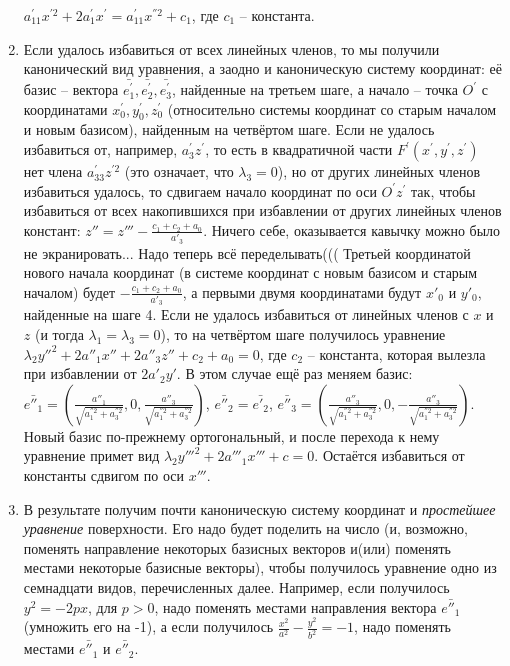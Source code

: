 \documentclass[a4paper, 12pt]{article}
\theoremstyle{definition}
\begin{document}
\begin{enumerate}
    $a_{11}^{'} x^{'2} + 2a_{1}^{'} x^{'} = a_{11}^{'} x^{''2} + c_1$, где $c_1$ – константа.
    \item Если удалось избавиться от всех линейных членов, то мы получили канонический вид уравнения, а заодно и каноническую систему координат: её базис – вектора $\bar{e_1^{'}}, \bar{e_2^{'}}, \bar{e_3^{'}}$, найденные на третьем шаге, а начало – точка $O^{'}$ с координатами $x_0^{'}, y_0^{'}, z_0^{'}$ (относительно системы координат со старым началом и новым базисом), найденным на четвёртом шаге.
    Если не удалось избавиться от, например, $a_3^{'} z^{'}$, то есть в квадратичной части $F^{'}(x^{'},y^{'},z^{'})$ нет члена $a_33^{'} z^{'2}$ (это означает, что $\lambda_3 = 0$), но от других линейных членов избавиться удалось, то сдвигаем начало координат по оси $O^{'} z^{'}$ так, чтобы избавиться от всех накопившихся при избавлении от других линейных членов констант:
    $z'' = z''' - \frac{c_1 + c_2 + a_0}{a'_3}$. Ничего себе, оказывается кавычку можно было не экранировать... Надо теперь всё переделывать(((
    Третьей координатой нового начала координат (в системе координат с новым базисом и старым началом) будет $- \frac{c_1 + c_2 + a_0}{a'_3}$, а первыми двумя координатами будут $x'_0$ и $y'_0$, найденные на шаге 4. Если не удалось избавиться от линейных членов с $x$ и $z$ (и тогда $\lambda_1 = \lambda_3 = 0$), то на четвёртом шаге получилось уравнение $\lambda_2 y''^2 + 2a''_1 x'' + 2a''_3 z'' + c_2 + a_0 = 0$, где $c_2$ – константа, которая вылезла при избавлении от $2a'_2 y'$.
    В этом случае ещё раз меняем базис:
    $\bar{e''_1} = \left( \frac{a''_1}{\sqrt{a_1^{''2} + a_3^{''2}}}, 0, \frac{a''_3}{\sqrt{a_1^{''2} + a_3^{''2}}} \right)$,
    $\bar{e''_2} = \bar{e'_2}$,
    $\bar{e''_3} = \left( \frac{a''_3}{\sqrt{a_1^{''2} + a_3^{''2}}}, 0, -\frac{a''_3}{\sqrt{a_1^{''2} + a_3^{''2}}} \right)$.
    Новый базис по-прежнему ортогональный, и после перехода к нему уравнение примет вид $\lambda_2 y'''^2 + 2a'''_1 x''' + c = 0$.
    Остаётся избавиться от константы сдвигом по оси $x'''$.
    \item В результате получим почти каноническую систему координат и \textit{простейшее уравнение} поверхности. Его надо будет поделить на число (и, возможно, поменять направление некоторых базисных векторов и(или) поменять местами некоторые базисные векторы), чтобы получилось уравнение одно из семнадцати видов, перечисленных далее.
    Например, если получилось $y^2 = -2px$, для $p > 0$, надо поменять местами направления вектора $\bar{e''_1}$ (умножить его на -1), а если получилось
    $\frac{x^2}{a^2} - \frac{y^2}{b^2} = -1$, надо поменять местами $\bar{e''_1}$ и $\bar{e''_2}$.
\end{enumerate}
\end{document}
